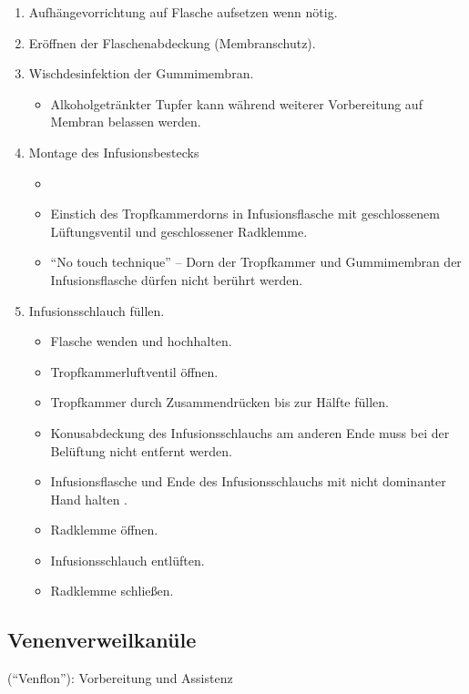 \begin{enumerate}
  \item Aufhängevorrichtung auf Flasche aufsetzen wenn nötig.
  \item Eröffnen der Flaschenabdeckung (Membranschutz).
  \item Wischdesinfektion der Gummimembran.
  \begin{itemize}
    \item Alkoholgetränkter Tupfer kann während weiterer Vorbereitung
    auf Membran belassen werden.
  \end{itemize}
  \item Montage des Infusionsbestecks
  \begin{itemize}
    \item {}
    \item Einstich des Tropfkammerdorns in Infusionsflasche mit
    geschlossenem Lüftungsventil und geschlossener Radklemme.
    \item "`No touch technique"' -- Dorn der
    Tropfkammer und Gummimembran der Infusionsflasche dürfen nicht
    berührt werden.
  \end{itemize}
  \item Infusionsschlauch füllen.
  \begin{itemize}
    \item Flasche wenden und hochhalten.
    \item Tropfkammerluftventil öffnen.
    \item Tropfkammer durch Zusammendrücken bis zur Hälfte füllen.
    \item Konusabdeckung des Infusionsschlauchs am anderen Ende muss bei der
    Belüftung nicht entfernt werden.
    \item Infusionsflasche und Ende des Infusionsschlauchs mit nicht
    dominanter Hand halten  .
    \item Radklemme öffnen.
    \item Infusionsschlauch entlüften.
    \item Radklemme schließen.
  \end{itemize}
\end{enumerate}


\subsection{Venenverweilkanüle}
("`Venflon"'): Vorbereitung und Assistenz 

